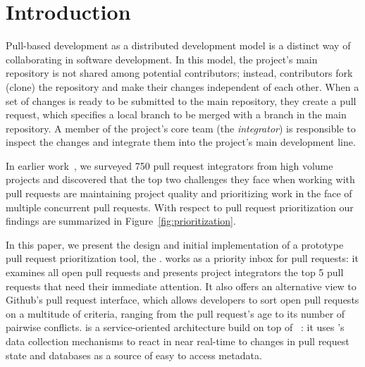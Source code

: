 \documentclass[conference]{IEEEtran}
\begin{document}



\section{Introduction}

Pull-based development as a distributed development model is a distinct way of
collaborating in software development. In this model, the project's main
repository is not shared among potential contributors; instead, contributors
fork (clone) the repository and make their changes independent of each other.
When a set of changes is ready to be submitted to the main repository, they
create a pull request, which specifies a local branch to be merged with a branch
in the main repository. A member of the project's core team (the
\emph{integrator}) is responsible to inspect the changes and integrate them into
the project's main development line.

In earlier work~\cite{GZSD15}, we surveyed 750 pull request integrators from high
volume projects and discovered that the top two challenges they face when
working with pull requests are maintaining project quality and prioritizing work
in the face of multiple concurrent pull requests. With respect to pull request
prioritization our findings are summarized in Figure~\ref{fig:prioritization}.

In this paper, we present the design and initial implementation of a prototype
pull request prioritization tool, the \prioritizer. \prioritizer works as a
priority inbox for pull requests: it examines all open pull requests and
presents project integrators the top 5 pull requests that need their immediate
attention. It also offers an alternative view to Github's pull request
interface, which allows developers to sort open pull requests on a multitude of
criteria, ranging from the pull request's age to its number of pairwise
conflicts. \prioritizer is a service-oriented architecture build on top of
\ghtorrent~\cite{G13}: it uses \ghtorrent's data collection mechanisms to react in near
real-time to changes in pull request state  and databases as a source of easy to
access metadata.
\end{document}

